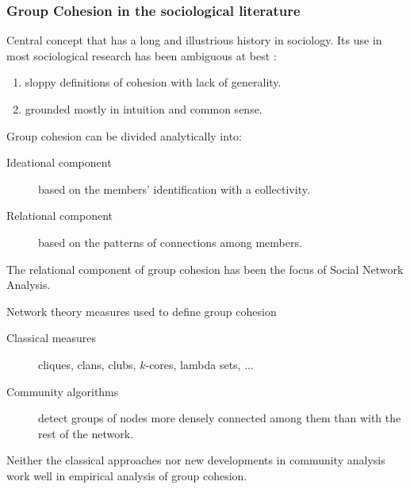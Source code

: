 \documentclass[ignorenonframetext,red,8pt,notes=show]{beamer}
\begin{document}
\begin{frame}[label=]
\frametitle{Group Cohesion in the sociological literature}

Central concept that has a long and illustrious history in sociology. Its use in most sociological research has been ambiguous at best \citep{moody:2003}: 

\begin{enumerate}

\item sloppy definitions of cohesion with lack of generality.

\item grounded mostly in intuition and common sense.

\end{enumerate}

\begin{block}{Group cohesion \citep{doreian:1998} can be divided analytically into:}

\begin{description}

\item[Ideational component] based on the members' identification with a collectivity.

\item[Relational component] based on the patterns of connections among members.

\end{description}

\end{block}

\pause

The relational component of group cohesion has been the focus of Social Network Analysis.

\begin{block}{Network theory measures used to define group cohesion}

\begin{description}

\item[Classical measures] cliques, clans, clubs, $k$-cores, lambda sets, ...

\item[Community algorithms] detect groups of nodes more densely connected among them than with the rest of the network.

\end{description}

\end{block}

Neither the classical approaches nor new developments in community analysis work well in empirical analysis of group cohesion.

\end{frame}
\end{document}
